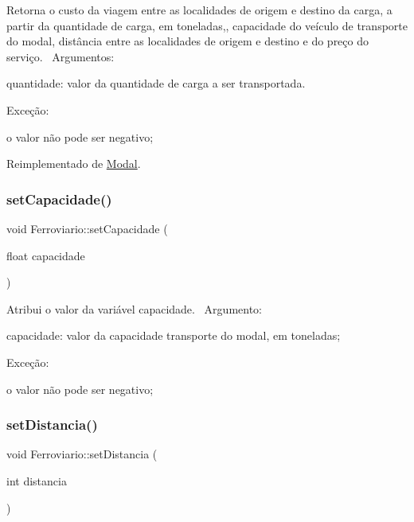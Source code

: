 Retorna o custo da viagem entre as localidades de origem e destino da carga, a partir da quantidade de carga, em toneladas,, capacidade do veículo de transporte do modal, distância entre as localidades de origem e destino e do preço do serviço.~\newline
Argumentos\+:
\begin{DoxyItemize}
\item quantidade\+: valor da quantidade de carga a ser transportada.
\end{DoxyItemize}

Exceção\+:
\begin{DoxyItemize}
\item o valor não pode ser negativo;
\end{DoxyItemize}

Reimplementado de \hyperlink{classModal_a20cee7247cce33806d681e1d60347cc5}{Modal}.

\mbox{\label{classFerroviario_aa40975457d7179ba75d5436251ca66e0}} 
\subsubsection{\texorpdfstring{set\+Capacidade()}{setCapacidade()}}
{\footnotesize\ttfamily void Ferroviario\+::set\+Capacidade (\begin{DoxyParamCaption}\item[{float}]{capacidade }\end{DoxyParamCaption})}

Atribui o valor da variável capacidade.~\newline
 Argumento\+:
\begin{DoxyItemize}
\item capacidade\+: valor da capacidade transporte do modal, em toneladas;
\end{DoxyItemize}

Exceção\+:
\begin{DoxyItemize}
\item o valor não pode ser negativo;
\end{DoxyItemize}\mbox{\label{classFerroviario_a3015ee3389051f06e8bccbd70832ca4a}} 
\subsubsection{\texorpdfstring{set\+Distancia()}{setDistancia()}}
{\footnotesize\ttfamily void Ferroviario\+::set\+Distancia (\begin{DoxyParamCaption}\item[{int}]{distancia }\end{DoxyParamCaption})}

